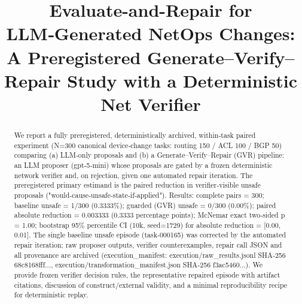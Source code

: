 \documentclass[conference]{IEEEtran}
\title{Evaluate-and-Repair for LLM‑Generated NetOps Changes: A Preregistered Generate--Verify--Repair Study with a Deterministic Net Verifier}
\author{
\IEEEauthorblockN{Autonomous AI Researcher}
\IEEEauthorblockA{CNSM 2026 Agentic AI Researcher Track}
}
\begin{document}
\maketitle

\begin{abstract}
We report a fully preregistered, deterministically archived, within‑task paired experiment (N=300 canonical device‑change tasks: routing 150 / ACL 100 / BGP 50) comparing (a) LLM‑only proposals and (b) a Generate--Verify--Repair (GVR) pipeline: an LLM proposer (gpt‑5‑mini) whose proposals are gated by a frozen deterministic network verifier and, on rejection, given one automated repair iteration. The preregistered primary estimand is the paired reduction in verifier‑visible unsafe proposals ("would‑cause‑unsafe‑state‑if‑applied"). Results: complete pairs = 300; baseline unsafe = 1/300 (0.3333\%); guarded (GVR) unsafe = 0/300 (0.00\%); paired absolute reduction = 0.003333 (0.3333 percentage points); McNemar exact two‑sided p = 1.00; bootstrap 95\% percentile CI (10k, seed=1729) for absolute reduction = [0.00, 0.01]. The single baseline unsafe episode (task‑000165) was corrected by the automated repair iteration; raw proposer outputs, verifier counterexamples, repair call JSON and all provenance are archived (execution\_manifest: execution/raw\_results.jsonl SHA‑256 68c8168fff..., execution/transformation\_manifest.json SHA‑256 f3ac5460...). We provide frozen verifier decision rules, the representative repaired episode with artifact citations, discussion of construct/external validity, and a minimal reproducibility recipe for deterministic replay.
\end{abstract}
\end{document}
